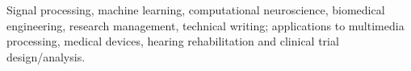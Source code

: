 Signal processing, machine learning, computational neuroscience, biomedical engineering, research management, technical writing; applications to multimedia processing, medical devices, hearing rehabilitation and clinical trial design/analysis.  %